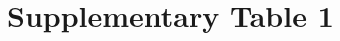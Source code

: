\documentclass{article}
\newcommand*\rot{\multicolumn{1}{R{45}{1em}}}%
\begin{document}
\newpage

\section*{Supplementary Table 1}

\end{document}
